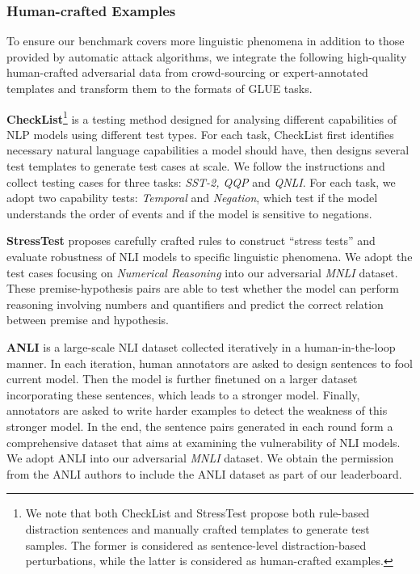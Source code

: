 \documentclass{article}
\begin{document}
\subsubsection{Human-crafted Examples}
To ensure  our benchmark covers more linguistic phenomena in addition to those provided by automatic attack algorithms, we integrate the following high-quality human-crafted adversarial data from crowd-sourcing or expert-annotated templates and transform them to the formats of GLUE tasks. 

\textbf{CheckList}\footnote{We note that both CheckList and StressTest propose both rule-based distraction sentences and manually crafted templates to generate test samples. The former is considered as sentence-level distraction-based perturbations, while the latter is considered as human-crafted examples. } \citep{checklist} is a testing method designed for analysing different capabilities of NLP models using different test types. For each task, CheckList first identifies necessary natural language capabilities a model should have, then designs several test templates to generate test cases at scale. We follow the instructions and collect testing cases for three tasks: \textit{SST-2, QQP} and \textit{QNLI}. For each task, we adopt two capability tests: \textit{Temporal} and \textit{Negation}, which test if the model understands the order of events and if the model is sensitive to negations. 

\textbf{StressTest}\footnotemark[\value{footnote}] \citep{stresstest} proposes carefully crafted rules to construct ``stress tests'' and evaluate robustness of NLI models to specific linguistic phenomena. We adopt the test cases focusing on \textit{Numerical Reasoning} into our adversarial \textit{MNLI} dataset. These premise-hypothesis pairs are able to test whether the model can perform reasoning involving numbers and quantifiers and predict the correct relation between premise and hypothesis. 

\textbf{ANLI} \citep{anli} is a large-scale NLI dataset collected iteratively in a human-in-the-loop manner. In each iteration, human annotators are asked to design sentences to fool current model. Then the model is further finetuned on a larger dataset incorporating these sentences, which leads to a stronger model. Finally, annotators are asked to write harder examples to detect the weakness of this stronger model. In the end, the sentence pairs generated in each round form a comprehensive dataset that aims at examining the vulnerability of NLI models. We adopt ANLI into our adversarial \textit{MNLI} dataset. We obtain the permission from the ANLI authors to include the ANLI dataset as part of our leaderboard.
\end{document}
